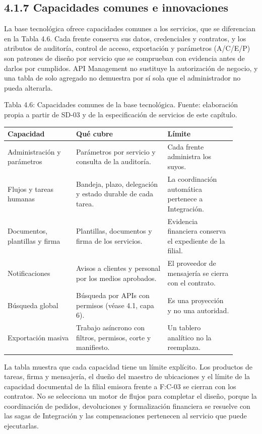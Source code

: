 \documentclass[11pt]{article}
\begin{document}
\subsection{4.1.7 Capacidades comunes e innovaciones}

La base tecnológica ofrece capacidades comunes a los servicios, que se diferencian en la Tabla 4.6. Cada frente conserva sus datos, credenciales y contratos, y los atributos de auditoría, control de acceso, exportación y parámetros (A/C/E/P) son patrones de diseño por servicio que se comprueban con evidencia antes de darlos por cumplidos. API Management no sustituye la autorización de negocio, y una tabla de solo agregado no demuestra por sí sola que el administrador no pueda alterarla.

\par\vspace{0pt plus 10\baselineskip}\vspace{0pt plus -10\baselineskip}

Tabla 4.6: Capacidades comunes de la base tecnológica. Fuente: elaboración propia a partir de SD-03 y de la especificación de servicios de este capítulo.\par\nopagebreak
\begin{longtable}{@{}p{0.27\linewidth}p{0.36\linewidth}p{0.27\linewidth}@{}}
\toprule Capacidad & Qué cubre & Límite \\
\midrule\endhead\bottomrule\endlastfoot
Administración y parámetros & Parámetros por servicio y consulta de la auditoría. & Cada frente administra los suyos. \\
Flujos y tareas humanas & Bandeja, plazo, delegación y estado durable de cada tarea. & La coordinación automática pertenece a Integración. \\
Documentos, plantillas y firma & Plantillas, documentos y firma de los servicios. & Evidencia financiera conserva el expediente de la filial. \\
Notificaciones & Avisos a clientes y personal por los medios aprobados. & El proveedor de mensajería se cierra con el contrato. \\
Búsqueda global & Búsqueda por APIs con permisos (véase 4.1, capa 6). & Es una proyección y no una autoridad. \\
Exportación masiva & Trabajo asíncrono con filtros, permisos, corte y manifiesto. & Un tablero analítico no la reemplaza. \\
\end{longtable}

La tabla muestra que cada capacidad tiene un límite explícito. Los productos de tareas, firma y mensajería, el dueño del maestro de ubicaciones y el límite de la capacidad documental de la filial emisora frente a F:C-03 se cierran con los contratos. No se selecciona un motor de flujos para completar el diseño, porque la coordinación de pedidos, devoluciones y formalización financiera se resuelve con las sagas de Integración y las compensaciones pertenecen al servicio que puede ejecutarlas.
\end{document}
